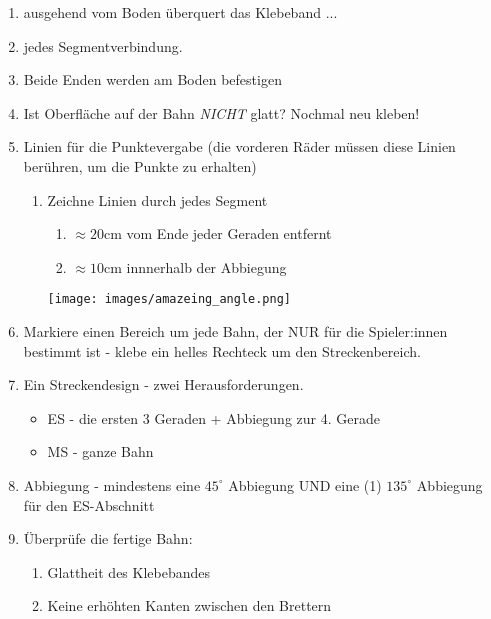 \documentclass[a4paper,12pt]{article}
\begin{document}
\begin{enumerate}
	\item ausgehend vom Boden überquert das Klebeband ...
	\item jedes Segmentverbindung.
	\item Beide Enden werden am Boden befestigen
	\item Ist Oberfläche auf der Bahn \emph{NICHT} glatt?
		Nochmal neu kleben!
	\item Linien für die Punktevergabe (die vorderen Räder müssen diese
		Linien berühren, um die Punkte zu erhalten)
	\begin{enumerate}
		\item Zeichne Linien durch jedes Segment
		\begin{enumerate}
			\item $\approx 20 \mathrm{cm}$ vom Ende jeder Geraden entfernt
			\item $\approx 10 \mathrm{cm}$ innnerhalb der Abbiegung
		\end{enumerate}
		\texttt{[image: images/amazeing\_angle.png]}
	\end{enumerate}
	\item Markiere einen Bereich um jede Bahn, der NUR für die
		Spieler:innen bestimmt ist - klebe ein helles Rechteck um den
		Streckenbereich.
	\item  Ein Streckendesign - zwei Herausforderungen.
	\begin{itemize}
		\item ES - die ersten 3 Geraden + Abbiegung zur 4. Gerade
		\item MS - ganze Bahn
	\end{itemize}
	\item Abbiegung - mindestens eine $45^{\circ}$ Abbiegung UND eine (1)
		$135^{\circ}$ Abbiegung für den ES-Abschnitt
	\item Überprüfe die fertige Bahn:
	\begin{enumerate}
		\item Glattheit des Klebebandes
		\item Keine erhöhten Kanten zwischen den Brettern
	\end{enumerate}
\end{enumerate}
\end{document}
